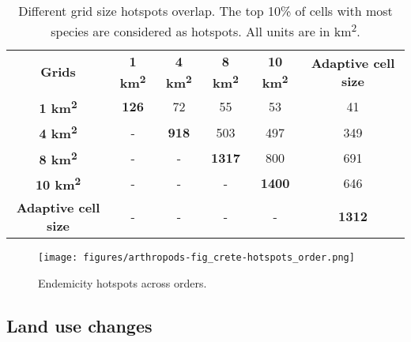 \begin{table}[]
    \caption{Different grid size hotspots overlap. The top 10\% of cells with most species are considered as hotspots. All units are in km\textsuperscript{2}.}
\begin{tabular}{cccccc}
\textbf{Grids}              & \textbf{1 km\textsuperscript{2}} & \textbf{4 km\textsuperscript{2}} & \textbf{8 km\textsuperscript{2}} & \textbf{10 km\textsuperscript{2}} & \textbf{Adaptive cell size} \\
\textbf{1 km\textsuperscript{2}}              & \textbf{126}   & 72             & 55             & 53              & 41                          \\
\textbf{4 km\textsuperscript{2}}              & -              & \textbf{918}   & 503            & 497             & 349                         \\
\textbf{8 km\textsuperscript{2}}              & -              & -              & \textbf{1317}  & 800             & 691                         \\
\textbf{10 km\textsuperscript{2}}             & -              & -              & -              & \textbf{1400}   & 646                         \\
\textbf{Adaptive cell size} & -              & -              & -              & -               & \textbf{1312}              
\end{tabular}
\label{table:arthropods-tableS2}
\end{table}


   \begin{figure}[ht]
      \centering
      \texttt{[image: figures/arthropods-fig\_crete-hotspots\_order.png]}
      \caption[Hotspots of every order]{Endemicity hotspots across orders.}
      \label{fig:arthropods-hotspots-order}
   \end{figure}

    \subsection{Land use changes}
    \label{subsec:arthropods-human-intervention}


